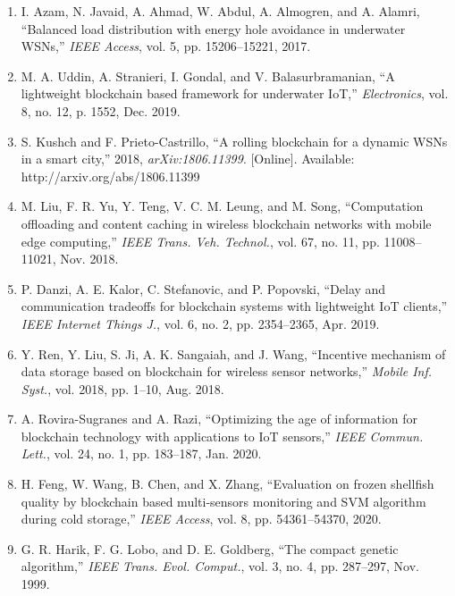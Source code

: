 \documentclass{article} %
\begin{document}
\begin{enumerate}
\item  I. Azam, N. Javaid, A. Ahmad, W. Abdul, A. Almogren, and A. Alamri, ``Balanced load distribution with energy hole avoidance in underwater WSNs,'' \textit{IEEE Access}, vol. 5, pp. 15206--15221, 2017.

\item  M. A. Uddin, A. Stranieri, I. Gondal, and V. Balasurbramanian, ``A lightweight blockchain based framework for underwater IoT,'' \textit{Electronics}, vol. 8, no. 12, p. 1552, Dec. 2019.

\item  S. Kushch and F. Prieto-Castrillo, ``A rolling blockchain for a dynamic WSNs in a smart city,'' 2018, \textit{arXiv:1806.11399}. [Online]. Available: http://arxiv.org/abs/1806.11399

\item  M. Liu, F. R. Yu, Y. Teng, V. C. M. Leung, and M. Song, ``Computation offloading and content caching in wireless blockchain networks with mobile edge computing,'' \textit{IEEE Trans. Veh. Technol.}, vol. 67, no. 11, pp. 11008--11021, Nov. 2018.

\item  P. Danzi, A. E. Kalor, C. Stefanovic, and P. Popovski, ``Delay and communication tradeoffs for blockchain systems with lightweight IoT clients,'' \textit{IEEE Internet Things J.}, vol. 6, no. 2, pp. 2354--2365, Apr. 2019.

\item  Y. Ren, Y. Liu, S. Ji, A. K. Sangaiah, and J. Wang, ``Incentive mechanism of data storage based on blockchain for wireless sensor networks,'' \textit{Mobile Inf. Syst.}, vol. 2018, pp. 1--10, Aug. 2018.

\item  A. Rovira-Sugranes and A. Razi, ``Optimizing the age of information for blockchain technology with applications to IoT sensors,'' \textit{IEEE Commun. Lett.}, vol. 24, no. 1, pp. 183--187, Jan. 2020.

\item  H. Feng, W. Wang, B. Chen, and X. Zhang, ``Evaluation on frozen shellfish quality by blockchain based multi-sensors monitoring and SVM algorithm during cold storage,'' \textit{IEEE Access}, vol. 8, pp. 54361--54370, 2020.

\item  G. R. Harik, F. G. Lobo, and D. E. Goldberg, ``The compact genetic algorithm,'' \textit{IEEE Trans. Evol. Comput.}, vol. 3, no. 4, pp. 287--297, Nov. 1999.


\end{enumerate}
\end{document}
